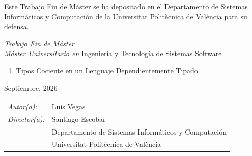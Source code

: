 \begin{titlepage}
\newpage
\thispagestyle{empty}
\noindent
Este Trabajo Fin de Máster se ha depositado en el Departamento de Sistemas Informàticos y Computación de la Universitat Politècnica de València para su defensa.

\vspace*{4cm}
\noindent
\textit{Trabajo Fin de Máster}\\
\textit{Máster Universitario en} Ingeniería y Tecnología de Sistemas Software

\begin{enumerate}
\item[\textit{Título:}] Tipos Cociente en un Lenguaje Dependientemente Tipado
\end{enumerate}
Septiembre, 2026


\vspace*{3cm}

\noindent
\begin{tabular}{ll}
\textit{Autor(a):} & Luis Vegas  \\ 
\textit{Director(a):} & Santiago Escobar  \\ 
                & Departamento de Sistemas Informáticos y Computación \\
                & Universitat Politècnica de València  \\

\end{tabular} 

\end{titlepage}
